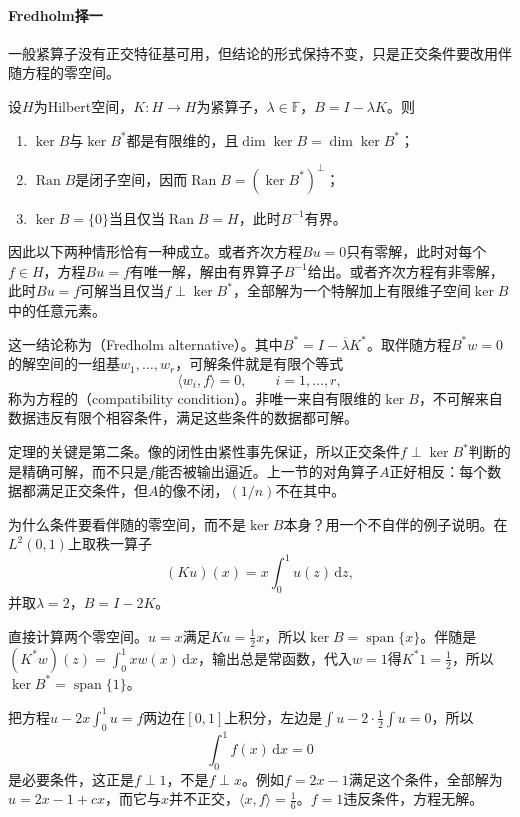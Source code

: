 \paragraph{Fredholm择一}
一般紧算子没有正交特征基可用，但结论的形式保持不变，只是正交条件要改用伴随方程的零空间。

\begin{theorem}[Fredholm择一]
\label{thm:opeq-fredholm}
设$H$为Hilbert空间，$K:H\to H$为紧算子，$\lambda\in\mathbb F$，$B=I-\lambda K$。则
\begin{enumerate}
  \item $\ker B$与$\ker B^*$都是有限维的，且$\dim\ker B=\dim\ker B^*$；
  \item $\operatorname{Ran}B$是闭子空间，因而$\operatorname{Ran}B=(\ker B^*)^\perp$；
  \item $\ker B=\{0\}$当且仅当$\operatorname{Ran}B=H$，此时$B^{-1}$有界。
\end{enumerate}
因此以下两种情形恰有一种成立。或者齐次方程$Bu=0$只有零解，此时对每个$f\in H$，方程$Bu=f$有唯一解，解由有界算子$B^{-1}$给出。或者齐次方程有非零解，此时$Bu=f$可解当且仅当$f\perp\ker B^*$，全部解为一个特解加上有限维子空间$\ker B$中的任意元素。
\end{theorem}

这一结论称为（Fredholm alternative）。其中$B^*=I-\overline\lambda K^*$。取伴随方程$B^*w=0$的解空间的一组基$w_1,\ldots,w_r$，可解条件就是有限个等式
\begin{equation}
  \langle w_i,f\rangle=0,\qquad i=1,\ldots,r,
  \label{eq:opeq-compatibility}
\end{equation}
称为方程的（compatibility condition）。非唯一来自有限维的$\ker B$，不可解来自数据违反有限个相容条件，满足这些条件的数据都可解。

定理的关键是第二条。像的闭性由紧性事先保证，所以正交条件$f\perp\ker B^*$判断的是精确可解，而不只是$f$能否被输出逼近。上一节的对角算子$A$正好相反：每个数据都满足正交条件，但$A$的像不闭，$(1/n)$不在其中。

为什么条件要看伴随的零空间，而不是$\ker B$本身？用一个不自伴的例子说明。在$L^2(0,1)$上取秩一算子
\[
  (Ku)(x)=x\int_0^1u(z)\,\mathrm dz,
\]
并取$\lambda=2$，$B=I-2K$。

直接计算两个零空间。$u=x$满足$Ku=\frac12x$，所以$\ker B=\operatorname{span}\{x\}$。伴随是$(K^*w)(z)=\int_0^1xw(x)\,\mathrm dx$，输出总是常函数，代入$w=1$得$K^*1=\frac12$，所以$\ker B^*=\operatorname{span}\{1\}$。

把方程$u-2x\int_0^1u=f$两边在$[0,1]$上积分，左边是$\int u-2\cdot\frac12\int u=0$，所以
\[
  \int_0^1f(x)\,\mathrm dx=0
\]
是必要条件，这正是$f\perp1$，不是$f\perp x$。例如$f=2x-1$满足这个条件，全部解为$u=2x-1+cx$，而它与$x$并不正交，$\langle x,f\rangle=\frac16$。$f=1$违反条件，方程无解。

